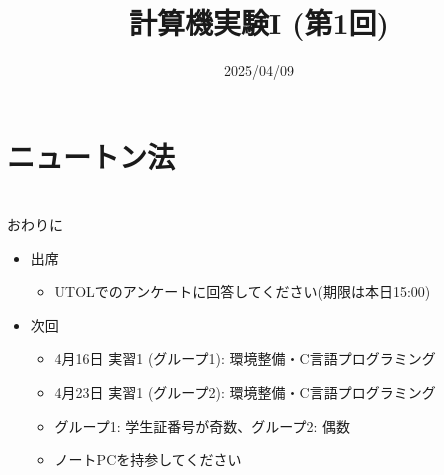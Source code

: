 \documentclass[10pt,dvipdfmx]{beamer}
\title{計算機実験I (第1回)}
\date{2025/04/09}
\begin{document}
\begin{frame}
  \titlepage
  \tableofcontents
\end{frame}








\section{ニュートン法}














\section{}
\begin{frame}[t]{おわりに}
  \begin{itemize}
  \item 出席
  \begin{itemize}
    \item UTOLでのアンケートに回答してください(期限は本日15:00)
  \end{itemize}
  \item 次回
    \begin{itemize}
    \item 4月16日 実習1 (グループ1): 環境整備・C言語プログラミング
    \item 4月23日 実習1 (グループ2): 環境整備・C言語プログラミング
    \item グループ1: 学生証番号が奇数、グループ2: 偶数
    \item ノートPCを持参してください
    \end{itemize}
  \end{itemize}
\end{frame}
\end{document}
